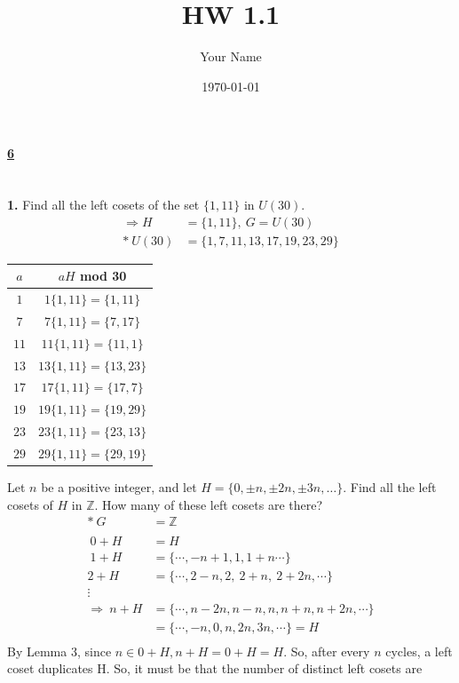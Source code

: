 \documentclass[12pt, letterpaper]{article}
\title{HW 1.1}
\author{Your Name}
\date{\today}
\begin{document}
 
\paragraph{\underline{6} \\ \\}
\textbf{1.} \quad {} Find all the left cosets of the set $\{1, 11\}$ in $U(30)$. 
\begin{align*}
\Rightarrow H &= \{1, 11\}, \ G = U(30) \\ 
    * \ U(30)   &= \{1, 7, 11, 13, 17, 19, 23, 29\}
\end{align*}
    \begin{center}
\begin{tabular}{|c|c|}
\hline
$a$ & $aH$ mod 30 \\
\hline
$1$  & $1\{1, 11\} = \{1, 11\}$ \\
$7$  & $7 \{1, 11\} = \{7, 17\}$ \\
$11$ & $11\{1, 11\} = \{11, 1\}$ \\
$13$ & $13\{1, 11\} = \{13, 23\}$ \\
$17$ & $17\{1, 11\} = \{17, 7\}$ \\ 
$19$ & $19\{1, 11\} = \{19, 29\}$ \\
$23$ & $23\{1, 11\} = \{23, 13\}$ \\
$29$ & $29\{1, 11\} = \{29, 19\}$ \\
\hline
\end{tabular}
\end{center}
\quad \quad {} Let $n$ be a positive integer, and let $H = \{0, \pm n, \pm 2n, \pm 3n, \ldots\}.$ Find all the left cosets of $H$ in $\mathbb{Z}$. How many of these left cosets are there? \\
\begin{align*} 
    * \ G &= \mathbb{Z} \  \\ \\
    \ 0+H &= H \\
     \ 1+H &= \{\cdots, -n + 1, 1, 1 + n \cdots\} \\ 
     2+ H &= \{\cdots, 2 - n, 2, \ 2 + n, \ 2 + 2n, \cdots \} \\
    \vdots \\ 
    \Rightarrow \ n + H &= \{\cdots, n -2n, n - n, n, n + n, n + 2n, \cdots\}\\
    &= \{\cdots, -n, 0, n, 2n, 3n, \cdots \} = H \\
    \end{align*}
    By Lemma 3, since $n \in 0 + H, n + H = 0 + H = H$. So, after every $n$ cycles, a left coset duplicates H. So, it must be that the number of distinct left cosets are
\end{document}

